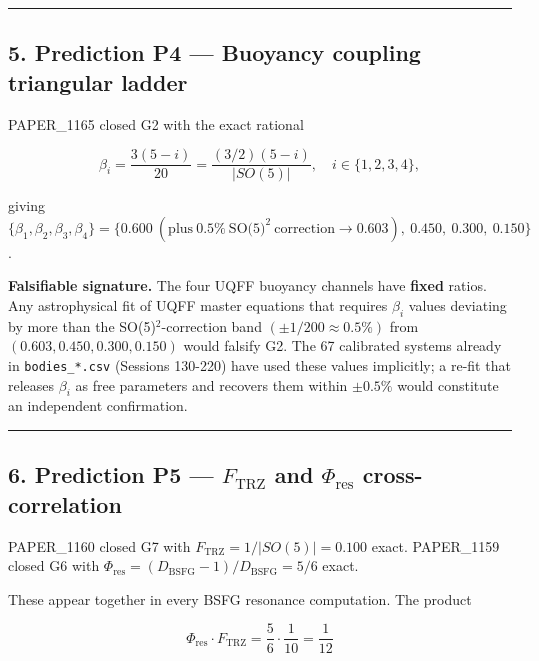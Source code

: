 \documentclass[
]{article}
\begin{document}
\begin{center}\rule{0.5\linewidth}{0.5pt}\end{center}

\subsection{5. Prediction P4 --- Buoyancy coupling triangular
ladder}\label{prediction-p4-buoyancy-coupling-triangular-ladder}

PAPER\_1165 closed G2 with the exact rational

\[
\beta_{i} = \frac{3(5-i)}{20} = \frac{(3/2)(5-i)}{|SO(5)|},
\quad i\in\{1,2,3,4\},
\]

giving
\(\{\beta_1,\beta_2,\beta_3,\beta_4\}=\{0.600\ (\text{plus}\ 0.5\%\ \text{SO(5)}^{2}\ \text{correction}\to 0.603),\ 0.450,\ 0.300,\ 0.150\}\).

\textbf{Falsifiable signature.} The four UQFF buoyancy channels have
\textbf{fixed} ratios. Any astrophysical fit of UQFF master equations
that requires \(\beta_{i}\) values deviating by more than the
SO(5)\(^{2}\)-correction band \((\pm 1/200 \approx 0.5\%)\) from
\((0.603, 0.450, 0.300, 0.150)\) would falsify G2. The 67 calibrated
systems already in \texttt{bodies\_*.csv} (Sessions 130-220) have used
these values implicitly; a re-fit that releases \(\beta_{i}\) as free
parameters and recovers them within \(\pm 0.5\%\) would constitute an
independent confirmation.

\begin{center}\rule{0.5\linewidth}{0.5pt}\end{center}

\subsection{\texorpdfstring{6. Prediction P5 --- \(F_{\mathrm{TRZ}}\)
and \(\Phi_{\mathrm{res}}\)
cross-correlation}{6. Prediction P5 --- F\_\{\textbackslash mathrm\{TRZ\}\} and \textbackslash Phi\_\{\textbackslash mathrm\{res\}\} cross-correlation}}\label{prediction-p5-f_mathrmtrz-and-phi_mathrmres-cross-correlation}

PAPER\_1160 closed G7 with \(F_{\text{TRZ}} = 1/|SO(5)| = 0.100\) exact.
PAPER\_1159 closed G6 with
\(\Phi_{\text{res}} = (D_{\text{BSFG}}-1)/D_{\text{BSFG}} = 5/6\) exact.

These appear together in every BSFG resonance computation. The product

\[
\Phi_{\text{res}}\cdot F_{\text{TRZ}} = \frac{5}{6}\cdot\frac{1}{10} = \frac{1}{12}
\]
\end{document}
